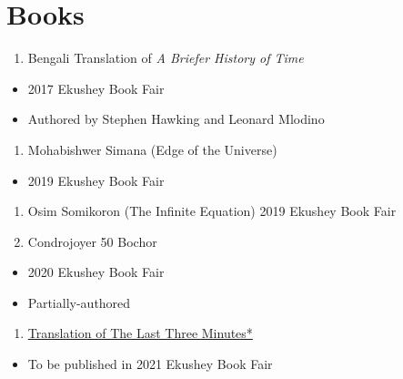 \documentclass[
]{book}
\providecommand{\tightlist}{%
  \setlength{\itemsep}{0pt}\setlength{\parskip}{0pt}}
\begin{document}
\hypertarget{books}{%
\section*{Books}\label{books}}

\begin{enumerate}
\def\labelenumi{\arabic{enumi}.}
\tightlist
\item
  Bengali Translation of \emph{A Briefer History of Time}
\end{enumerate}

\begin{itemize}
\tightlist
\item
  2017 Ekushey Book Fair
\item
  Authored by Stephen Hawking and Leonard Mlodino
\end{itemize}

\begin{enumerate}
\def\labelenumi{\arabic{enumi}.}
\setcounter{enumi}{1}
\tightlist
\item
  Mohabishwer Simana (Edge of the Universe)
\end{enumerate}

\begin{itemize}
\tightlist
\item
  2019 Ekushey Book Fair
\end{itemize}

\begin{enumerate}
\def\labelenumi{\arabic{enumi}.}
\setcounter{enumi}{2}
\item
  Osim Somikoron (The Infinite Equation) 2019 Ekushey Book Fair
\item
  Condrojoyer 50 Bochor
\end{enumerate}

\begin{itemize}
\tightlist
\item
  2020 Ekushey Book Fair
\item
  Partially-authored
\end{itemize}

\begin{enumerate}
\def\labelenumi{\arabic{enumi}.}
\setcounter{enumi}{4}
\tightlist
\item
  \href{https://l3m.bishwo.com/}{Translation of The Last Three Minutes*}
\end{enumerate}

\begin{itemize}
\tightlist
\item
  To be published in 2021 Ekushey Book Fair
\end{itemize}
\end{document}
